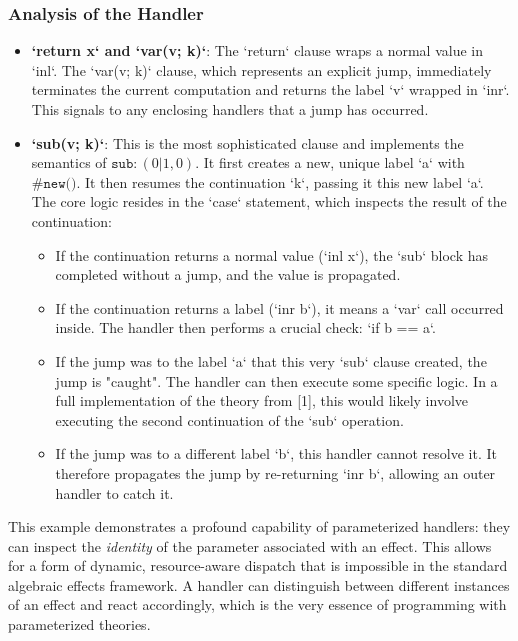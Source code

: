 \documentclass{article}
\begin{document}
\subsubsection{Analysis of the Handler}
\begin{itemize}
    \item \textbf{`return x` and `var(v; k)`}: The `return` clause wraps a normal value in `inl`. The `var(v; k)` clause, which represents an explicit jump, immediately terminates the current computation and returns the label `v` wrapped in `inr`. This signals to any enclosing handlers that a jump has occurred.

    \item \textbf{`sub(v; k)`}: This is the most sophisticated clause and implements the semantics of $\texttt{sub}: (0|1,0)$. It first creates a new, unique label `a` with $\texttt{\#new()}$. It then resumes the continuation `k`, passing it this new label `a`. The core logic resides in the `case` statement, which inspects the result of the continuation:
    \begin{itemize}
        \item If the continuation returns a normal value (`inl x`), the `sub` block has completed without a jump, and the value is propagated.
        \item If the continuation returns a label (`inr b`), it means a `var` call occurred inside. The handler then performs a crucial check: `if b == a`.
        \item If the jump was to the label `a` that this very `sub` clause created, the jump is "caught". The handler can then execute some specific logic. In a full implementation of the theory from [1], this would likely involve executing the second continuation of the `sub` operation.
        \item If the jump was to a different label `b`, this handler cannot resolve it. It therefore propagates the jump by re-returning `inr b`, allowing an outer handler to catch it.
    \end{itemize}
\end{itemize}
This example demonstrates a profound capability of parameterized handlers: they can inspect the \emph{identity} of the parameter associated with an effect. This allows for a form of dynamic, resource-aware dispatch that is impossible in the standard algebraic effects framework. A handler can distinguish between different instances of an effect and react accordingly, which is the very essence of programming with parameterized theories.
\end{document}
